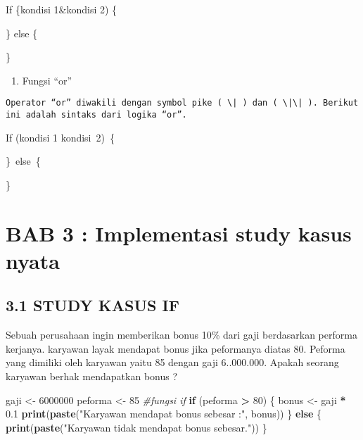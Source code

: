 \documentclass[
]{article}
\newenvironment{Shaded}{\begin{snugshade}}{\end{snugshade}}
\newcommand{\CommentTok}[1]{\textcolor[rgb]{0.56,0.35,0.01}{\textit{#1}}}
\newcommand{\ControlFlowTok}[1]{\textcolor[rgb]{0.13,0.29,0.53}{\textbf{#1}}}
\newcommand{\DecValTok}[1]{\textcolor[rgb]{0.00,0.00,0.81}{#1}}
\newcommand{\FloatTok}[1]{\textcolor[rgb]{0.00,0.00,0.81}{#1}}
\newcommand{\FunctionTok}[1]{\textcolor[rgb]{0.13,0.29,0.53}{\textbf{#1}}}
\newcommand{\NormalTok}[1]{#1}
\newcommand{\OtherTok}[1]{\textcolor[rgb]{0.56,0.35,0.01}{#1}}
\newcommand{\SpecialCharTok}[1]{\textcolor[rgb]{0.81,0.36,0.00}{\textbf{#1}}}
\newcommand{\StringTok}[1]{\textcolor[rgb]{0.31,0.60,0.02}{#1}}
\providecommand{\tightlist}{%
  \setlength{\itemsep}{0pt}\setlength{\parskip}{0pt}}
\begin{document}
If \{kondisi 1\&kondisi 2) \{

\} else \{

\}

\begin{enumerate}
\def\labelenumi{\arabic{enumi}.}
\setcounter{enumi}{1}
\tightlist
\item
  Fungsi ``or''
\end{enumerate}

\begin{verbatim}
Operator “or” diwakili dengan symbol pike ( \| ) dan ( \|\| ). Berikut ini adalah sintaks dari logika “or”.
\end{verbatim}

If (kondisi 1 \textbar\textbar{} kondisi~2)~\{

\}~else~\{

\}

\section{BAB 3 : Implementasi study kasus
nyata}\label{bab-3-implementasi-study-kasus-nyata}

\subsection{3.1 STUDY KASUS IF}\label{study-kasus-if}

Sebuah perusahaan ingin memberikan bonus 10\% dari gaji berdasarkan
performa kerjanya. karyawan layak mendapat bonus jika peformanya diatas
80. Peforma yang dimiliki oleh karyawan yaitu 85 dengan gaji 6..000.000.
Apakah seorang karyawan berhak mendapatkan bonus ?

\begin{Shaded}
\begin{Highlighting}[]
\NormalTok{gaji }\OtherTok{\textless{}{-}} \DecValTok{6000000}
\NormalTok{peforma }\OtherTok{\textless{}{-}} \DecValTok{85}
\CommentTok{\#fungsi if}
\ControlFlowTok{if}\NormalTok{ (peforma }\SpecialCharTok{\textgreater{}} \DecValTok{80}\NormalTok{) \{}
\NormalTok{  bonus }\OtherTok{\textless{}{-}}\NormalTok{ gaji }\SpecialCharTok{*} \FloatTok{0.1}
  \FunctionTok{print}\NormalTok{(}\FunctionTok{paste}\NormalTok{(}\StringTok{"Karyawan mendapat bonus sebesar :"}\NormalTok{, bonus))}
\NormalTok{\} }\ControlFlowTok{else}\NormalTok{ \{}
  \FunctionTok{print}\NormalTok{(}\FunctionTok{paste}\NormalTok{(}\StringTok{"Karyawan tidak mendapat bonus sebesar."}\NormalTok{))}
\NormalTok{\}}
\end{Highlighting}
\end{Shaded}
\end{document}

